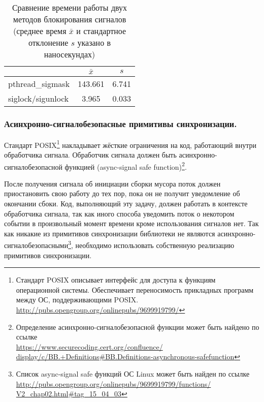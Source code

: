 \begin{table}[h!]
\caption{Сравнение времени работы двух методов блокирования сигналов (среднее время $\bar{x}$ 
и стандартное отклонение $s$ указано в наносекундах)}
\label{table:siglock}
\begin{center}
\begin{tabular}{|l|c|c|}
\hline
                            & $\bar{x}$    & $s$       \\ \hline
pthread\_sigmask            & 143.661      & 6.741     \\ \hline
siglock/sigunlock           & 3.965        & 0.033     \\ \hline
\end{tabular}
\end{center}
\end{table}


\subsubsection{Асинхронно-сигналобезопасные примитивы синхронизации.}
Стандарт POSIX\footnote{Стандарт POSIX описывает интерфейс для доступа к функциям 
операционной системы. 
Обеспечивает переносимость прикладных программ между ОС, поддерживающими POSIX. \\
\url{http://pubs.opengroup.org/onlinepubs/9699919799/}} 
накладывает жёсткие ограничения на код, работающий внутри обработчика сигнала. 
Обработчик сигнала должен быть асинхронно-сигналобезопасной функцией 
(async-signal safe function)\footnote{Определение асинхронно-сигналобезопасной функции 
может быть найдено по ссылке\\ \url{https://www.securecoding.cert.org/confluence/
display/c/BB.+Definitions\#BB.Definitions-asynchronous-safefunction}}. 

После получения сигнала об инициации сборки мусора поток должен приостановить свою работу 
до тех пор, пока он не получит уведомление об окончании сбоки. 
Код, выполняющий эту задачу, должен работать в контексте обработчика сигнала, так как иного 
способа уведомить поток о некотором событии в произвольный момент времени кроме использования 
сигналов нет. 
Так как никакие из примитивов синхронизации библиотеки  не являются 
асинхронно-сигналобезопасными\footnote{Список async-signal safe функций ОС Linux может 
быть найден по ссылке\\ \url{http://pubs.opengroup.org/onlinepubs/9699919799/functions/
V2\_chap02.html\#tag\_15\_04\_03}}, 
необходимо использовать собственную реализацию примитивов синхронизации.

